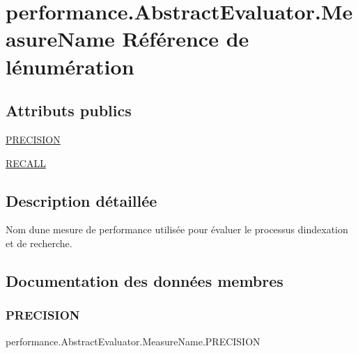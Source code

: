 \hypertarget{enumperformance_1_1AbstractEvaluator_1_1MeasureName}{}\section{performance.\+Abstract\+Evaluator.\+Measure\+Name Référence de l\textquotesingle{}énumération}
\label{enumperformance_1_1AbstractEvaluator_1_1MeasureName}
\subsection*{Attributs publics}
\begin{DoxyCompactItemize}
\item 
\hyperlink{enumperformance_1_1AbstractEvaluator_1_1MeasureName_ada1c9bd17a38f7893b45a7dfa7acaeee}{P\+R\+E\+C\+I\+S\+I\+ON}
\item 
\hyperlink{enumperformance_1_1AbstractEvaluator_1_1MeasureName_a758fde2a6b8a432907b59bdc97ede41d}{R\+E\+C\+A\+LL}
\end{DoxyCompactItemize}


\subsection{Description détaillée}
Nom d\textquotesingle{}une mesure de performance utilisée pour évaluer le processus d\textquotesingle{}indexation et de recherche. 

\subsection{Documentation des données membres}
\mbox{\label{enumperformance_1_1AbstractEvaluator_1_1MeasureName_ada1c9bd17a38f7893b45a7dfa7acaeee}} 
\subsubsection{\texorpdfstring{P\+R\+E\+C\+I\+S\+I\+ON}{PRECISION}}
{\footnotesize\ttfamily performance.\+Abstract\+Evaluator.\+Measure\+Name.\+P\+R\+E\+C\+I\+S\+I\+ON}

